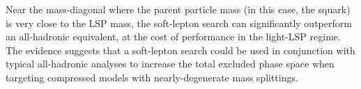 Near the mass-diagonal where the parent particle mass (in this case, the squark) is very close to the LSP mass, the soft-lepton search can significantly outperform an all-hadronic equivalent, at the cost of performance in the light-LSP regime. The evidence suggests that a soft-lepton search could be used in conjunction with typical all-hadronic analyses to increase the total excluded phase space when targeting compressed models with nearly-degenerate mass splittings.




